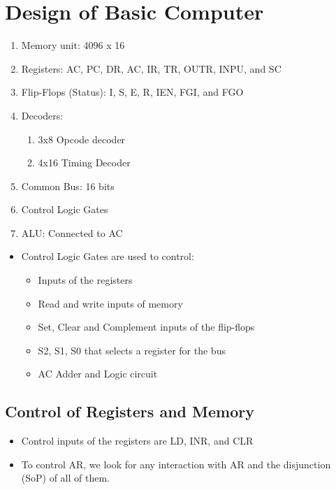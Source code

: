 \documentclass[11pt]{article}
\newenvironment{NumberedList}{%
  \begin{enumerate}[leftmargin=2em, itemsep=0.35em, topsep=0.35em]
}{%
  \end{enumerate}
}
\begin{document}
\section{Design of Basic Computer}
\begin{NumberedList}
  \item Memory unit: 4096 x 16
  \item Registers: AC, PC, DR, AC, IR, TR, OUTR, INPU, and SC
  \item Flip-Flops (Status): I, S, E, R, IEN, FGI, and FGO
  \item Decoders: 
  \begin{NumberedList}
    \item 3x8 Opcode decoder
    \item 4x16 Timing Decoder
  \end{NumberedList}
  \item Common Bus: 16 bits
  \item Control Logic Gates 
  \item ALU: Connected to AC
\end{NumberedList}
\begin{itemize}
  \item Control Logic Gates are used to control:
  \begin{itemize}
    \item Inputs of the registers
    \item Read and write inputs of memory
    \item Set, Clear and Complement inputs of the flip-flops
    \item S2, S1, S0 that selects a register for the bus
    \item AC Adder and Logic circuit
  \end{itemize}
\end{itemize}

\subsection{Control of Registers and Memory}
\begin{itemize}
  \item Control inputs of the registers are LD, INR, and CLR
  \item To control AR, we look for any interaction with AR and the disjunction (SoP) of all of them.
\end{itemize}
\end{document}
